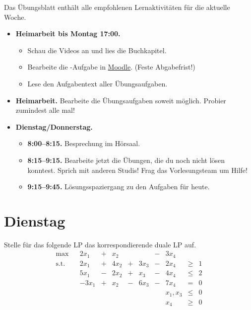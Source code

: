 \documentclass{uebung_cs}
\begin{document}
Das Übungsblatt enthält alle empfohlenen Lernaktivitäten für die aktuelle Woche.

\begin{itemize}
\item \textbf{Heimarbeit bis Montag 17:00.}
    \begin{itemize}
    \item 
    Schau die Videos an und lies die Buchkapitel.
    \item Bearbeite die -Aufgabe in \href{https://moodle.studiumdigitale.uni-frankfurt.de/moodle/course/view.php?id=2241}{Moodle}. (Feste Abgabefrist!)
    \item Lese den Aufgabentext aller Übungsaufgaben.
    \end{itemize}
\item \textbf{Heimarbeit.} Bearbeite die Übungsaufgaben soweit möglich. Probier zumindest alle mal!
\item \textbf{Dienstag/Donnerstag.}
\begin{itemize}
    \item \textbf{8:00--8:15.} Besprechung im Hörsaal.
    \item \textbf{8:15--9:15.} Bearbeite jetzt die Übungen, die du noch nicht lösen konntest. Sprich mit anderen Studis! Frag das Vorlesungsteam um Hilfe!
    \item \textbf{9:15--9:45.} Lösungsspaziergang zu den Aufgaben für heute.
\end{itemize}
\end{itemize}

\section*{Dienstag}

\begin{exercise}
	Stelle für das folgende \acs{LP} das korrespondierende duale \acs{LP} auf.
	\[
		\begin{array}{rrrlllllllll}
		\text{max}    &     &   2 x_1       &   +     &   x_2   &       &         &   -   & 3x_4  &         &   \\
		\text{s.t.}  &     &   2x_1      &   +     &   4x_2  &   +   &  3 x_3   &   -   & 2x_4   &  \geq   & 1 \\
							&     &   5x_1      &   -     &   2x_2   &   +   &   x_3  &   -   & 4x_4  &  \leq   & 2 \\
							&     &   -3x_1     & +     &   x_2  &   -   &   6x_3  &   -   & 7 x_4   &   =     & 0 \\
							&     &           &       &         &       &       &         &x_1,x_3   & \leq    &   0      \\
							&     &          &       &         &       &       &         &  x_4       & \geq    &   0    
		\end{array}
	\]
	
\end{exercise}
\end{document}
